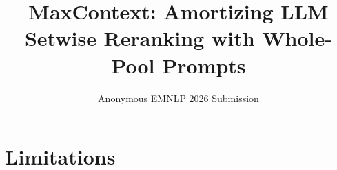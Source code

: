 \documentclass[11pt]{article}
\title{MaxContext: Amortizing LLM Setwise Reranking with Whole-Pool Prompts}
\author{Anonymous EMNLP 2026 Submission}
\begin{document}
\maketitle

\begin{abstract}

\end{abstract}









\section*{Limitations}




\appendix


\end{document}
